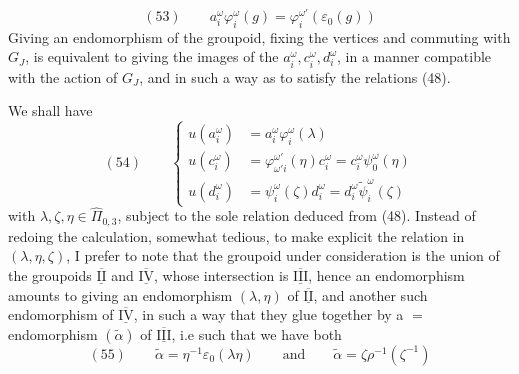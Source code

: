 \[
(53)\qquad a_i^\omega\varphi_i^\omega(g)=\varphi_i^{\omega'}(\varepsilon_0(g))
\]
Giving an endomorphism of the  groupoid, fixing the vertices and commuting with $G_J$, is equivalent to giving the  images of the $a_i^\omega,c_i^\omega,d_i^\omega$, in a manner  compatible with the action of $G_J$, and in such a way as to satisfy the relations (48).

We shall have
\[
(54)\qquad\left\{\begin{aligned}
u(a_i^\omega)&=a_i^\omega\varphi_i^\omega(\lambda)\\
u(c_i^\omega)&=\varphi_{\omega'i}^{\omega'}(\eta)c_i^\omega=c_i^\omega\psi_{0}^\omega(\eta)\\
u(d_i^\omega)&=\psi_i^\omega(\zeta)d_i^\omega=d_i^\omega\widetilde\psi_i^\omega(\zeta)
\end{aligned}\right.
\]
with $\lambda,\zeta,\eta\in\widehat\Pi_{0,3}$, subject to the sole relation deduced from (48). Instead of redoing the calculation, somewhat tedious, to make explicit the relation in $(\lambda,\eta,\zeta)$, I prefer to note that the  groupoid under consideration is the union of the groupoids $\overline{\underline{\mathrm{II}}}$ and $\overline{\underline{\mathrm{IV}}}$, whose intersection is $\overline{\underline{\mathrm{III}}}$, hence  an endomorphism  amounts to giving  an endomorphism $(\lambda,\eta)$ of $\overline{\underline{\mathrm{II}}}$, and another such endomorphism \inserted{$\zeta$} of $\overline{\underline{\mathrm{IV}}}$, in such a way that they glue together  by a $=$ endomorphism $(\widetilde\alpha)$ of $\overline{\underline{\mathrm{III}}}$, i.e such that we have both
\[
(55)\qquad\widetilde\alpha=\eta^{-1}\varepsilon_0(\lambda\eta)\qquad\text{and}\qquad
\widetilde\alpha=\zeta\rho^{-1}(\zeta^{-1})
\]
